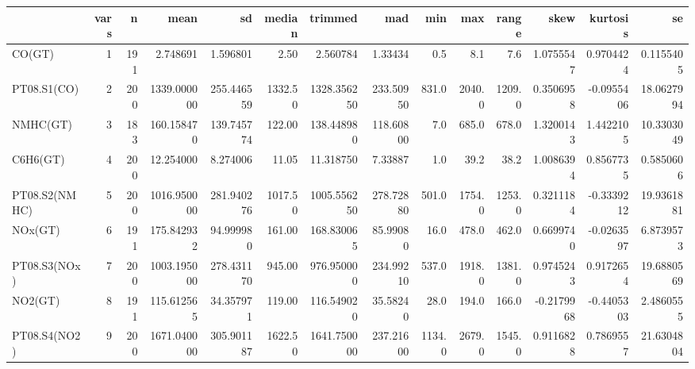 
\begin{tabular}{l|r|r|r|r|r|r|r|r|r|r|r|r|r}
\hline
  & vars & n & mean & sd & median & trimmed & mad & min & max & range & skew & kurtosis & se\\
\hline
CO(GT) & 1 & 191 & 2.748691 & 1.596801 & 2.50 & 2.560784 & 1.33434 & 0.5 & 8.1 & 7.6 & 1.0755547 & 0.9704424 & 0.1155405\\
\hline
PT08.S1(CO) & 2 & 200 & 1339.000000 & 255.446559 & 1332.50 & 1328.356250 & 233.50950 & 831.0 & 2040.0 & 1209.0 & 0.3506958 & -0.0955406 & 18.0627994\\
\hline
NMHC(GT) & 3 & 183 & 160.158470 & 139.745774 & 122.00 & 138.448980 & 118.60800 & 7.0 & 685.0 & 678.0 & 1.3200143 & 1.4422105 & 10.3303049\\
\hline
C6H6(GT) & 4 & 200 & 12.254000 & 8.274006 & 11.05 & 11.318750 & 7.33887 & 1.0 & 39.2 & 38.2 & 1.0086394 & 0.8567735 & 0.5850606\\
\hline
PT08.S2(NMHC) & 5 & 200 & 1016.950000 & 281.940276 & 1017.50 & 1005.556250 & 278.72880 & 501.0 & 1754.0 & 1253.0 & 0.3211184 & -0.3339212 & 19.9361881\\
\hline
NOx(GT) & 6 & 191 & 175.842932 & 94.999980 & 161.00 & 168.830065 & 85.99080 & 16.0 & 478.0 & 462.0 & 0.6699740 & -0.0263597 & 6.8739573\\
\hline
PT08.S3(NOx) & 7 & 200 & 1003.195000 & 278.431170 & 945.00 & 976.950000 & 234.99210 & 537.0 & 1918.0 & 1381.0 & 0.9745243 & 0.9172654 & 19.6880569\\
\hline
NO2(GT) & 8 & 191 & 115.612565 & 34.357971 & 119.00 & 116.549020 & 35.58240 & 28.0 & 194.0 & 166.0 & -0.2179968 & -0.4405303 & 2.4860555\\
\hline
PT08.S4(NO2) & 9 & 200 & 1671.040000 & 305.901187 & 1622.50 & 1641.750000 & 237.21600 & 1134.0 & 2679.0 & 1545.0 & 0.9116828 & 0.7869557 & 21.6304804\\
\hline
\end{tabular}
